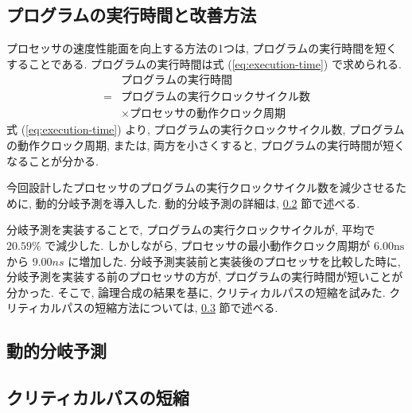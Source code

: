 \documentclass[../main.tex]{subfiles}
\begin{document}
  \subsection{プログラムの実行時間と改善方法}
  プロセッサの速度性能面を向上する方法の1つは, プログラムの実行時間を短くすることである.
  プログラムの実行時間は式 (\ref{eq:execution-time}) で求められる.
  \begin{equation}
    \begin{aligned}
      &プログラムの実行時間 \\
      = &プログラムの実行クロックサイクル数 \\
      &\times プロセッサの動作クロック周期
      \label{eq:execution-time}
    \end{aligned}
  \end{equation}
  式 (\ref{eq:execution-time}) より, プログラムの実行クロックサイクル数, プログラムの動作クロック周期, 
  または, 両方を小さくすると, プログラムの実行時間が短くなることが分かる.

  今回設計したプロセッサのプログラムの実行クロックサイクル数を減少させるために, 動的分岐予測を導入した.
  動的分岐予測の詳細は, \ref{subsection:jump-prediction} 節で述べる.

  分岐予測を実装することで, プログラムの実行クロックサイクルが, 平均で $20.59\%$ で減少した.
  しかしながら, プロセッサの最小動作クロック周期が $6.00\unit{\ns}$ から $9.00\unit{ns}$ に増加した.
  分岐予測実装前と実装後のプロセッサを比較した時に, 
  分岐予測を実装する前のプロセッサの方が, 
  プログラムの実行時間が短いことが分かった.
  そこで, 論理合成の結果を基に, クリティカルパスの短縮を試みた.
  クリティカルパスの短縮方法については, \ref{subsection:critical-path} 節で述べる.

  \subsection{動的分岐予測} \label{subsection:jump-prediction}
  

  \subsection{クリティカルパスの短縮} \label{subsection:critical-path}
  
\end{document}
